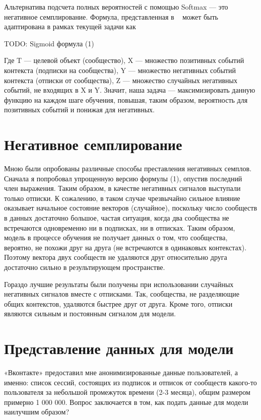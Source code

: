 \documentclass[times,specification,annotation]{itmo-student-thesis}
\begin{document}
Альтернатива подсчета полных вероятностей с помощью Softmax --- это
негативное семплирование. Формула, представленная в ~\cite{airbnb} может быть
адаптирована в рамках текущей задачи как

TODO: Sigmoid формула (1)

Где T --- целевой объект (сообщество), X --- множество позитивных событий
контекста (подписки на сообщества), Y --- множество негативных событий
контекста (отписки от сообщества), Z --- множество случайных негативных
событий, не входящих в X и Y. Значит, наша задача --- максимизировать данную
функцию на каждом шаге обучения, повышая, таким образом, вероятность для
позитивных событий и понижая для негативных.

\section{ Негативное семплирование}
Мною были опробованы различные способы преставления негативных
семплов. Сначала я попробовал упрощенную версию формулы (1), опустив
последний член выражения. Таким образом, в качестве негативных сигналов
выступали только отписки. К сожалению, в таком случае чрезвычайно сильное
влияние оказывает начальное состояние векторов (случайное), поскольку число
сообществ в данных достаточно большое, частая ситуация, когда два сообщества
не встречаются одновременно ни в подписках, ни в отписках. Таким образом,
модель в процессе обучения не получает данных о том, что сообщества, вероятно,
не похожи друг на друга (не встречаются в одинаковых контекстах). Поэтому
вектора двух сообществ не удаляются друг относительно друга достаточно сильно
в результирующем пространстве.

Гораздо лучшие результаты были получены при использовании случайных
негативных сигналов вместе с отписками. Так, сообщества, не разделяющие общих
контекстов, удаляются быстрее друг от друга. Кроме того, отписки являются
сильным и постоянным сигналом для модели.

\section{Представление данных для модели}
«Вконтакте» предоставил мне анонимизированные данные пользователей, а
именно: список сессий, состоящих из подписок и отписок от сообществ какого-то
пользователя за небольшой промежуток времени (2-3 месяца), общим размером
примерно 1 000 000. Вопрос заключается в том, как подать данные для модели
наилучшим образом?
\end{document}
